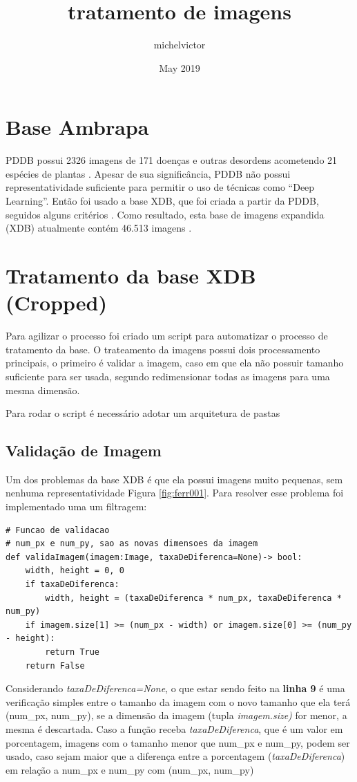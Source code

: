 \documentclass{article}
\title{tratamento de imagens}
\author{michelvictor }
\date{May 2019}
\begin{document}
\maketitle

\section{Base Ambrapa}
 PDDB possui 2326 imagens de 171 doenças e outras desordens acometendo 21 espécies de plantas \citep{Embrapa}. Apesar de sua significância, PDDB não possui representatividade suficiente para permitir o uso de técnicas como “Deep  Learning”.
 Então foi usado a base XDB, que foi criada a partir da PDDB, seguidos alguns critérios \citep{Embrapa}.   Como  resultado,  esta base de imagens expandida (XDB) atualmente contém 46.513 imagens \citep{Embrapa}.
 

\section{Tratamento da base XDB (Cropped)}
Para agilizar o processo foi criado um script para automatizar o processo de tratamento da base. O trateamento da imagens possui dois processamento principais, o primeiro é validar a imagem, caso em que ela não possuir tamanho suficiente para ser usada, segundo redimensionar todas as imagens para uma mesma dimensão.

Para rodar o script\cite{github} é necessário adotar um arquitetura de pastas

\subsection{Validação de Imagem}
Um dos problemas da base XDB é que ela possui imagens muito pequenas, sem nenhuma representatividade Figura \ref{fig:ferr001}. Para resolver esse problema foi implementado uma um filtragem:

\begin{lstlisting}
# Funcao de validacao
# num_px e num_py, sao as novas dimensoes da imagem
def validaImagem(imagem:Image, taxaDeDiferenca=None)-> bool:
    width, height = 0, 0
    if taxaDeDiferenca:
        width, height = (taxaDeDiferenca * num_px, taxaDeDiferenca * num_py)
    if imagem.size[1] >= (num_px - width) or imagem.size[0] >= (num_py - height):
        return True
    return False
\end{lstlisting}
Considerando \textit{taxaDeDiferenca=None}, o que estar sendo feito na \textbf{linha 9} é uma verificação simples entre o tamanho da imagem com o novo tamanho que ela terá (num\_px, num\_py), se a dimensão da imagem (tupla \textit{imagem.size)} for menor, a mesma é descartada. Caso a função receba \textit{taxaDeDiferenca}, que é um valor em porcentagem, imagens com o tamanho menor que num\_px e num\_py, podem ser usado, caso sejam maior que a diferença entre a porcentagem (\textit{taxaDeDiferenca}) em relação a num\_px e num\_py com (num\_px, num\_py)
\end{document}
